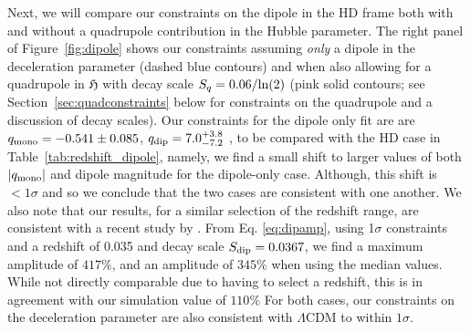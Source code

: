 \documentclass[fleqn,usenatbib]{mnras}
\newcommand{\jess}[1]{\textcolor{magenta} {\textbf{[JAC]:{#1}}}}
\begin{document}
{Next, we will compare our constraints on the dipole in the HD frame both} 
with and without a quadrupole contribution in the Hubble parameter. The right panel of Figure~\ref{fig:dipole}
shows our constraints assuming \textit{only} a dipole in the deceleration parameter {(dashed blue contours)}
and when also allowing for a quadrupole in $\mathfrak{H}$ with decay scale $S_q = 0.06/{\rm ln}(2)$ {(pink solid contours; see Section~\ref{sec:quadconstraints} below for constraints on the quadrupole and a discussion of decay scales)}.
Our constraints for the dipole only fit are %
are %
{$q_{\rm mono} = -0.541\pm 0.085$, $q_{\rm dip}=7.0^{+3.8}_{-7.2}$} {, to be compared with the HD case in Table~\ref{tab:redshift_dipole}, %
namely, we find a small shift to larger values of both $|q_{\rm mono}|$ and dipole magnitude for the dipole-only case. Although, this shift is{ $<1\sigma$} and so we conclude that the two cases are consistent with one another. } We also note that our results, for a similar selection of the redshift range, are consistent with a recent study by \citet{Sorrenti2022}.
From Eq. \ref{eq:dipamp}, using 1$\sigma$ constraints and a redshift of 0.035 and decay scale $S_{\rm dip} = 0.0367$, we find a {maximum} amplitude of $417\%$, and an amplitude of $345\%$ when using the median values. While not directly comparable due to having to select a redshift, this is in agreement with our simulation value of $110\%$  {For both cases, our constraints on the deceleration parameter} are also consistent with %
$\Lambda$CDM to within $1\sigma$. 


         
\end{document}
